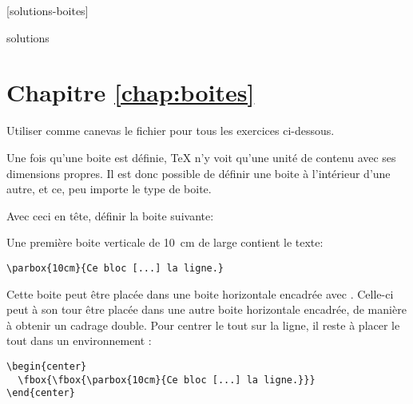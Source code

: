 [solutions-boites]

\begin{Filesave}{solutions}
\section*{Chapitre \ref*{chap:boites}}

\end{Filesave}

\noindent%
Utiliser comme canevas le fichier  pour
tous les exercices ci-dessous.

\begin{exercice}
  Une fois qu'une boite est définie, {\TeX} n'y voit qu'une unité de
  contenu avec ses dimensions propres. Il est donc possible de définir
  une boite à l'intérieur d'une autre, et ce, peu importe le type de
  boite.

  Avec ceci en tête, définir la boite suivante:
  \begin{center}
  \end{center}

  \begin{sol}
    Une première boite verticale de 10~cm de large contient le texte:
\begin{lstlisting}
\parbox{10cm}{Ce bloc [...] la ligne.}
\end{lstlisting}
    Cette boite peut être placée dans une boite horizontale encadrée
    avec \cmd{\fbox}. Celle-ci peut à son tour être placée dans une autre
    boite horizontale encadrée, de manière à obtenir un cadrage
    double. Pour centrer le tout sur la ligne, il reste à placer le
    tout dans un environnement :
\begin{lstlisting}
\begin{center}
  \fbox{\fbox{\parbox{10cm}{Ce bloc [...] la ligne.}}}
\end{center}
\end{lstlisting}
  \end{sol}
\end{exercice}

